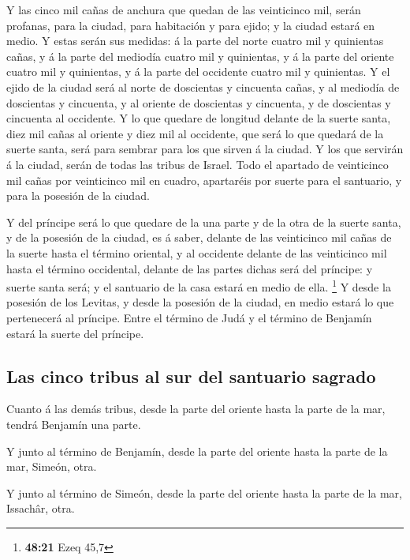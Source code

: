  Y las cinco mil cañas de anchura que quedan de las
veinticinco mil, serán profanas, para la ciudad, para habitación y para
ejido; y la ciudad estará en medio.  Y estas serán sus
medidas: á la parte del norte cuatro mil y quinientas cañas, y á la
parte del mediodía cuatro mil y quinientas, y á la parte del oriente
cuatro mil y quinientas, y á la parte del occidente cuatro mil y
quinientas.  Y el ejido de la ciudad será al norte de
doscientas y cincuenta cañas, y al mediodía de doscientas y cincuenta, y
al oriente de doscientas y cincuenta, y de doscientas y cincuenta al
occidente.  Y lo que quedare de longitud delante de la
suerte santa, diez mil cañas al oriente y diez mil al occidente, que
será lo que quedará de la suerte santa, será para sembrar para los que
sirven á la ciudad.  Y los que servirán á la ciudad, serán
de todas las tribus de Israel.  Todo el apartado de
veinticinco mil cañas por veinticinco mil en cuadro, apartaréis por
suerte para el santuario, y para la posesión de la ciudad.

 Y del príncipe será lo que quedare de la una parte y de la
otra de la suerte santa, y de la posesión de la ciudad, es á saber,
delante de las veinticinco mil cañas de la suerte hasta el término
oriental, y al occidente delante de las veinticinco mil hasta el término
occidental, delante de las partes dichas será del príncipe: y suerte
santa será; y el santuario de la casa estará en medio de ella.
\footnote{\textbf{48:21} Ezeq 45,7}  Y desde la posesión de
los Levitas, y desde la posesión de la ciudad, en medio estará lo que
pertenecerá al príncipe. Entre el término de Judá y el término de
Benjamín estará la suerte del príncipe.

\hypertarget{las-cinco-tribus-al-sur-del-santuario-sagrado}{%
\subsection{Las cinco tribus al sur del santuario
sagrado}\label{las-cinco-tribus-al-sur-del-santuario-sagrado}}

 Cuanto á las demás tribus, desde la parte del oriente
hasta la parte de la mar, tendrá Benjamín una parte.

 Y junto al término de Benjamín, desde la parte del oriente
hasta la parte de la mar, Simeón, otra.

 Y junto al término de Simeón, desde la parte del oriente
hasta la parte de la mar, Issachâr, otra.

